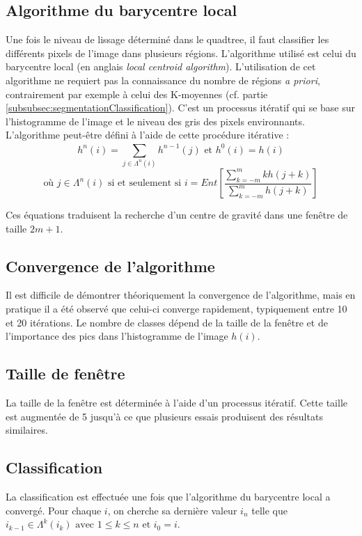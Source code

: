 \subsection{Algorithme du barycentre local}
	Une fois le niveau de lissage déterminé dans le quadtree, il faut classifier les différents pixels de l'image dans plusieurs régions. L'algorithme utilisé est celui du barycentre local (en anglais \textit{local centroid algorithm}). L'utilisation de cet algorithme ne requiert pas la connaissance du nombre de régions \textit{a priori}, contrairement par exemple à celui des K-moyennes (cf. partie \ref{subsubsec:segmentationClassification}). C'est un processus itératif qui se base sur l'histogramme de l'image et le niveau des gris des pixels environnants.\\

	L'algorithme peut-être défini à l'aide de cette procédure itérative :\\
	\[ h^n(i) = \sum_{j \in \Lambda^n(i)}^{} h^{n-1}(j) \mbox{ et } h^0(i) = h(i) \]
	\[\mbox{où } j \in \Lambda^n(i) \mbox{ si et seulement si } i = Ent[\frac{\sum\limits_{k=-m}^{m} kh( j + k)}{\sum\limits_{k=-m}^{m} h(j + k)}] \]

	Ces équations traduisent la recherche d'un centre de gravité dans une fenêtre de taille $2m + 1$.

\subsection{Convergence de l'algorithme}
	Il est difficile de démontrer théoriquement la convergence de l'algorithme, mais en pratique il a été observé que celui-ci converge rapidement, typiquement entre 10 et 20 itérations. Le nombre de classes dépend de la taille de la fenêtre et de l'importance des pics dans l'histogramme de l'image $h(i)$.

\subsection{Taille de fenêtre}
	La taille de la fenêtre est déterminée à l'aide d'un processus itératif. Cette taille est augmentée de 5 jusqu'à ce que plusieurs essais produisent des résultats similaires.

\subsection{Classification}
	La classification est effectuée une fois que l'algorithme du barycentre local a convergé. Pour chaque $i$, on cherche sa dernière valeur $i_n$ telle que $i_{k-1} \in \Lambda^k (i_k) \mbox{ avec } 1 \leq k \leq n \mbox{ et } i_0 = i$.